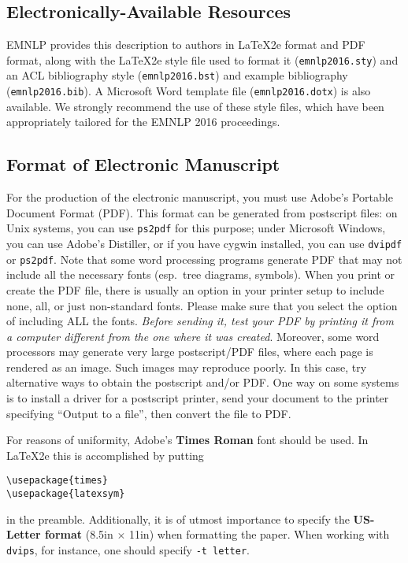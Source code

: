\documentclass[11pt,letterpaper]{article}
\begin{document}
\subsection{Electronically-Available Resources}

EMNLP provides this description to authors in \LaTeX2e{} format
and PDF format, along with the \LaTeX2e{} style file used to format it
({\small\tt emnlp2016.sty}) and an ACL bibliography style
({\small\tt emnlp2016.bst}) and example bibliography
({\small\tt emnlp2016.bib}). A Microsoft Word template file
({\small\tt emnlp2016.dotx}) is also available. We strongly recommend the
use of these style files, which have been appropriately tailored for the
EMNLP 2016 proceedings.

\subsection{Format of Electronic Manuscript}
\label{sect:pdf}

For the production of the electronic manuscript, you must use Adobe's
Portable Document Format (PDF). This format can be generated from
postscript files: on Unix systems, you can use {\small\tt ps2pdf} for this
purpose; under Microsoft Windows, you can use Adobe's Distiller, or
if you have cygwin installed, you can use {\small\tt dvipdf} or
{\small\tt ps2pdf}.  Note 
that some word processing programs generate PDF that may not include
all the necessary fonts (esp.\ tree diagrams, symbols). When you print
or create the PDF file, there is usually an option in your printer
setup to include none, all, or just non-standard fonts.  Please make
sure that you select the option of including ALL the fonts.  {\em Before
sending it, test your {\/\em PDF} by printing it from a computer different
from the one where it was created}. Moreover, some word processors may
generate very large postscript/PDF files, where each page is rendered as
an image. Such images may reproduce poorly.  In this case, try alternative
ways to obtain the postscript and/or PDF.  One way on some systems is to
install a driver for a postscript printer, send your document to the
printer specifying ``Output to a file'', then convert the file to PDF.

For reasons of uniformity, Adobe's {\bf Times Roman} font should be
used. In \LaTeX2e{} this is accomplished by putting
\small
\begin{verbatim}
\usepackage{times}
\usepackage{latexsym}
\end{verbatim}
\normalsize
in the preamble.
Additionally, it is of utmost importance to specify the {\bf US-Letter
format} (8.5in $\times$ 11in) when formatting the paper. When working with
{\small\tt dvips}, for instance, one should specify {\small\tt -t letter}.
\end{document}
